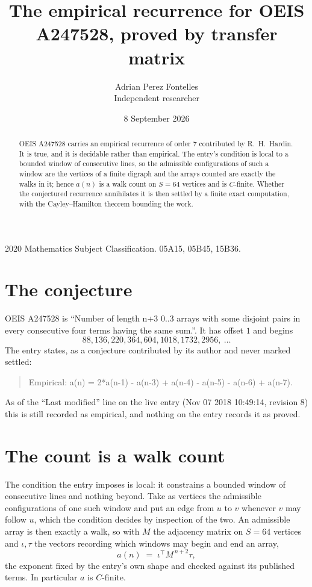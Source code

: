 \documentclass[11pt,a4paper]{article}
\title{The empirical recurrence for OEIS A247528, proved by transfer matrix}
\author{Adrian Perez Fontelles\\ \small Independent researcher}
\date{8 September 2026}
\theoremstyle{plain}
\theoremstyle{definition}
\begin{document}
\maketitle

\begin{abstract}
OEIS A247528 carries an empirical recurrence of order $7$ contributed by R.~H.~Hardin. It is
true, and it is decidable rather than empirical. The entry's condition is local to a bounded window of consecutive lines, so
the admissible configurations of such a window are the vertices of a finite digraph and the
arrays counted are exactly the walks in it; hence $a(n)$ is a walk count on $S=64$ vertices
and is $C$-finite. Whether the conjectured recurrence annihilates it is then settled by a
finite exact computation, with the Cayley--Hamilton theorem bounding the work.
\end{abstract}

\noindent\small 2020 Mathematics Subject Classification. 05A15, 05B45, 15B36.\normalsize

\section{The conjecture}

OEIS A247528 is ``Number of length n+3 0..3 arrays with some disjoint pairs in every consecutive four terms having the same sum.''. It has offset $1$ and begins
\[
88, 136, 220, 364, 604, 1018, 1732, 2956,\ \dots
\]
The entry states, as a conjecture contributed by its author and never marked settled:
\begin{quote}
Empirical: a(n) = 2*a(n-1) - a(n-3) + a(n-4) - a(n-5) - a(n-6) + a(n-7).
\end{quote}
As of the ``Last modified'' line on the live entry (Nov 07 2018 10:49:14, revision 8) this is still
recorded as empirical, and nothing on the entry records it as proved.

\section{The count is a walk count}

The condition the entry imposes is local: it constrains a bounded window of consecutive lines and nothing beyond. Take as
vertices the admissible configurations of one such window and put an edge from $u$ to $v$
whenever $v$ may follow $u$, which the condition decides by inspection of the two. An
admissible array is then exactly a walk, so with $M$ the adjacency matrix on $S=64$ vertices
and $\iota,\tau$ the vectors recording which windows may begin and end an array,
\[
a(n)\;=\;\iota^{\!\top}M^{\,n+2}\tau ,
\]
the exponent fixed by the entry's own shape and checked against its published terms. In
particular $a$ is $C$-finite.
\end{document}
